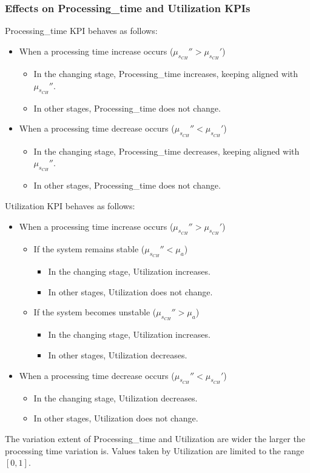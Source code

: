\subsubsection{Effects on Processing\_time and Utilization KPIs}
Processing\_time KPI behaves as follows:
\begin{itemize}
\item When a processing time increase occurs ($\mu_{s_{CH}}''>\mu_{s_{CH}}'$) 
\begin{itemize}
\item In the changing stage, Processing\_time increases, keeping aligned with $\mu_{s_{CH}}''$. 
\item In other stages, Processing\_time does not change.
\end{itemize}
\item When a processing time decrease occurs ($\mu_{s_{CH}}''<\mu_{s_{CH}}'$)
\begin{itemize}
\item In the changing stage, Processing\_time decreases, keeping aligned with $\mu_{s_{CH}}''$.
\item In other stages, Processing\_time does not change.
\end{itemize}
\end{itemize}
Utilization KPI behaves as follows:
\begin{itemize}
	\item When a processing time increase occurs ($\mu_{s_{CH}}''>\mu_{s_{CH}}'$)
	\begin{itemize}
		\item If the system remains stable ($\mu_{s_{CH}}''<\mu_a$)
		\begin{itemize}
			\item In the changing stage, Utilization increases. 
			\item In other stages, Utilization does not change.
		\end{itemize}
		\item If the system becomes unstable ($\mu_{s_{CH}}''>\mu_a$)
		\begin{itemize}
			\item In the changing stage, Utilization increases. 
			\item In other stages, Utilization decreases.
		\end{itemize}
	\end{itemize}
	\item When a processing time decrease occurs ($\mu_{s_{CH}}''<\mu_{s_{CH}}'$)
	\begin{itemize}
		\item In the changing stage, Utilization decreases.
		\item In other stages, Utilization does not change.
	\end{itemize}
\end{itemize}
The variation extent of Processing\_time and Utilization are wider the larger the processing time variation is. Values taken by Utilization are limited to the range $[0,1]$.

